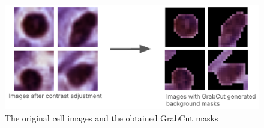 \begin{figure}[H]
    \begin{centering}
    \includegraphics[width=14cm]{assets/images/work-grabcut-result.png}
    \par\end{centering}
    \caption{The original cell images and the obtained GrabCut masks}
    \label{fig:work-grabcut}
\end{figure}
